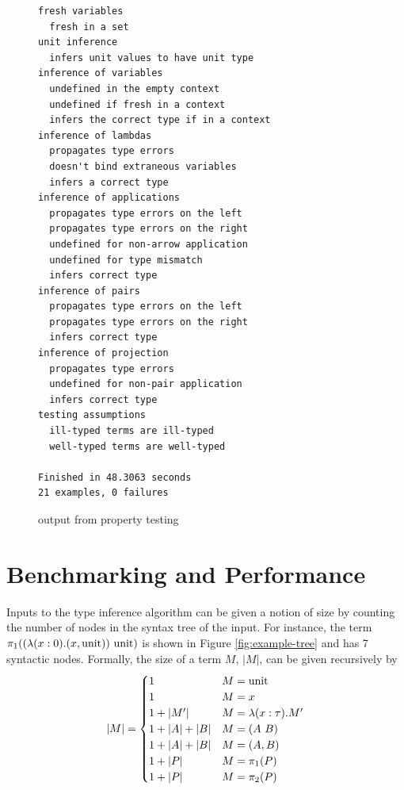 \begin{figure}
\centering
\begin{verbatim}
fresh variables
  fresh in a set
unit inference
  infers unit values to have unit type
inference of variables
  undefined in the empty context
  undefined if fresh in a context
  infers the correct type if in a context
inference of lambdas
  propagates type errors
  doesn't bind extraneous variables
  infers a correct type
inference of applications
  propagates type errors on the left
  propagates type errors on the right
  undefined for non-arrow application
  undefined for type mismatch
  infers correct type
inference of pairs
  propagates type errors on the left
  propagates type errors on the right
  infers correct type
inference of projection
  propagates type errors
  undefined for non-pair application
  infers correct type
testing assumptions
  ill-typed terms are ill-typed
  well-typed terms are well-typed

Finished in 48.3063 seconds
21 examples, 0 failures
\end{verbatim}
\caption{output from property testing}
\label{fig:tests-output}
\end{figure}

\section{Benchmarking and Performance}
\label{sec:benchmarking}
Inputs to the type inference algorithm can be given a notion of size by counting the number of nodes in the syntax tree of the input.
For instance, the term \(\pi_1((\lambda (x : 0). (x, \mathrm{unit}))\ \mathrm{unit})\) is shown in Figure \ref{fig:example-tree} and has 7 syntactic nodes.
Formally, the size of a term \(M\), \(|M|\), can be given recursively by
\[
|M| =
\begin{cases}
1 & M = \mathrm{unit}\\
1 & M = x\\
1 + |M'| & M = \lambda (x : \tau). M'\\
1 + |A| + |B| & M = (A\ B)\\
1 + |A| + |B| & M = (A, B)\\
1 + |P| & M = \pi_1(P)\\
1 + |P| & M = \pi_2(P)\\
\end{cases}
\]

